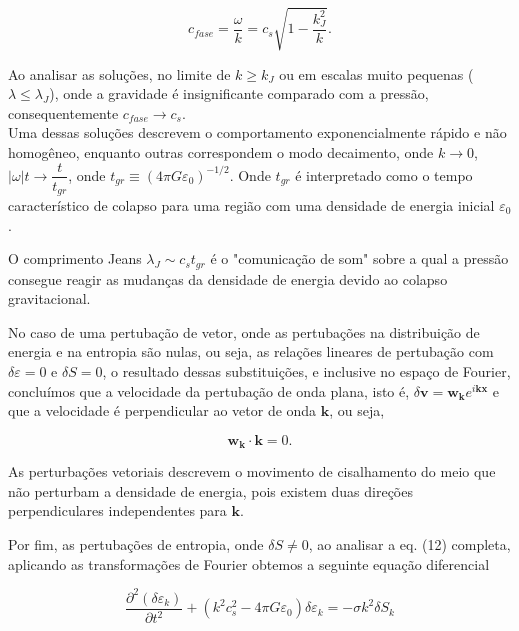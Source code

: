 \begin{equation}\label{eq16}
	c_{fase} = \dfrac{\omega}{k}= c_s\sqrt{1 - \dfrac{k^2_J}{k}}.
\end{equation}

Ao analisar as soluções, no limite de $k \geq k_J$ ou em escalas muito pequenas ($\lambda \leq \lambda_J$), onde a gravidade é insignificante comparado com a pressão, consequentemente $c_{fase} \to c_s$.\\

Uma dessas soluções descrevem o comportamento exponencialmente rápido e não homogêneo, enquanto outras correspondem o modo decaimento, onde $k \to 0$, $|\omega | t \to \dfrac{t}{t_{gr}}$, onde $t_{gr} \equiv (4\pi G\varepsilon_0)^{-1/2}$. Onde $t_{gr}$ é interpretado como o tempo característico de colapso para uma região com uma densidade de energia inicial $\varepsilon_0$.

O comprimento Jeans $\lambda_J \sim c_s t_{gr} $ é o "comunicação de som" sobre a qual a pressão consegue reagir as mudanças da densidade de energia devido ao colapso gravitacional.

No caso de uma pertubação de vetor, onde as pertubações na distribuição de energia e na entropia são nulas, ou seja, as relações lineares de pertubação com $ \delta\varepsilon = 0 $ e $ \delta S = 0$, o resultado dessas substituições, e inclusive no espaço de Fourier, concluímos que a velocidade da pertubação de onda plana, isto é, $\delta\mathbf{v} = \mathbf{w_k} e^{i\mathbf{k}\mathbf{x}}$ e que a velocidade é perpendicular ao vetor de onda $\mathbf{k}$, ou seja,

\begin{equation}\label{eq17}
	\mathbf{w_k} \cdot \mathbf{k} = 0.
\end{equation}

 As perturbações vetoriais descrevem o movimento de cisalhamento do meio que não perturbam a densidade de energia, pois existem duas direções perpendiculares independentes para $\mathbf{k}$.
 
 Por fim, as pertubações de entropia, onde $ \delta S \neq 0$, ao analisar a eq. (12) completa, aplicando as transformações de Fourier obtemos a seguinte equação diferencial 
 
\begin{equation}\label{eq18}
 	\dfrac{\partial^2 (\delta\varepsilon_k )}{\partial t^2} +(k^2c^2_s - 4\pi G\varepsilon_0)\delta\varepsilon_k  = -\sigma k^2 \delta S_k
\end{equation} 
 
